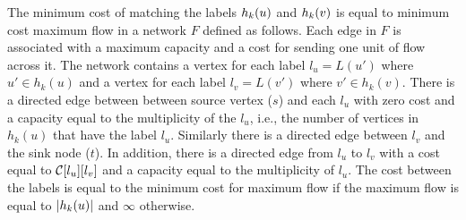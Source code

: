 \medskip{} The minimum cost of
matching the \khop labels $h_{k}(u)$ and $h_{k}(v)$ is equal to
minimum cost maximum flow in a network $F$ defined as follows.
Each edge in $F$ is associated with a maximum capacity and a cost for
sending one unit of flow across it.  The network contains a vertex for
each label $l_u = L(u')$ where $u' \in h_k(u)$ and a vertex for each
label $l_v = L(v')$ where $v' \in h_k(v)$. There is a directed edge between
between source vertex ($s$) and each $l_u$ with zero cost and a capacity
equal to the multiplicity of the $l_u$, i.e., the number of vertices in
$h_k(u)$ that have the label $l_u$. Similarly there is a directed edge
between $l_v$ and the sink node ($t$). In addition, there is a directed
edge from $l_u$ to $l_v$ with a cost equal to ${\mathcal{C}}[l_u][l_v]$
and a capacity equal to the multiplicity of $l_u$. The cost between the
\khop labels is equal to the minimum cost for maximum flow if the
maximum flow is equal to $|h_{k}(u)|$ and $\infty$ otherwise.

